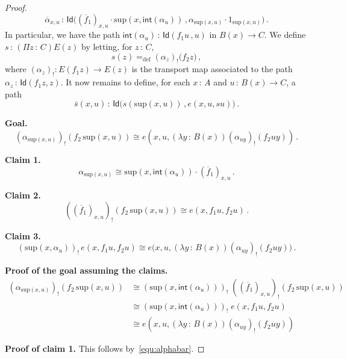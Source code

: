 \documentclass[10pt,a4paper,oneside,reqno]{amsart}
\numberwithin{equation}{section}
\theoremstyle{mythm}
\theoremstyle{mydef}
\theoremstyle{myrmk}
\newcommand{\defeq}{=_{\mathrm{def}}}
\newcommand{\co}{\,{:}\,}
\newcommand{\ct}{\cdot}
\renewcommand{\int}{\mathsf{int}}
\newcommand{\Id}{\mathsf{Id}}
\renewcommand{\sup}{\mathrm{sup}}
\begin{document}
\begin{proof}
\begin{equation}
\label{equ:alphabar}
\overline{\alpha}_{x,u} \co \Id \big(  (\overline{f}_1)_{x,u} \ct \sup(x,\int(\alpha_u)) \, , \alpha_{\sup(x,u)} \cdot 1_{\sup(x,u)} \big)  \, . 
\end{equation}
In particular, we have the path $\int(\alpha_u )\co \Id( f_1  u \, ,  u)$ in $B(x) \to C$. 
We define $s \co (\Pi z \co C) E(z)$ by letting, for $z \co C$, 
\begin{equation*}
s(z) \defeq (\alpha_z)_{!} \big(  f_2 z \big) \, ,
\end{equation*}
where  $(\alpha_z)_{!} : E(f_1 z) \to E(z)$ is the transport map associated to the path
$\alpha_z \co \Id( f_1 z,  z)$. It now remains to  define, for each $x \co A$ and $u \co B(x)\to C$, 
a path
\[
\bar{s}(x,u) \co \Id\big( s(\sup(x,u)) \, , e(x, u, s  u) \big) \, .
\] 

\noindent
\textbf{Goal.} 
\begin{equation}\label{eq:proof:thm:WMain:needpath}
(\alpha_{\sup(x,u)})_{!} (  f_2 \, \sup(x,u) )  \cong
e(x, u, (\lambda y \co B(x)) (\alpha_{u y})_{!} ( f_2 u y)   )  \, .
\end{equation}

\bigskip

\noindent
\textbf{Claim 1.} 
\[
\alpha_{\sup(x,u)} \cong \sup(x, \int(\alpha_u)) \ct (\overline{f}_1)_{x,u} \, .
\]

\medskip

\noindent
\textbf{Claim 2.} 
\[
((\overline{f}_1)_{x,u})_{!} (f_2 \, \sup(x,u)) \cong e(x,  f_1 u, f_2 u) \, .
\]

\noindent
\textbf{Claim 3.}
\[
(\sup(x, \alpha_u))_{!} \, e(x, f_1 u, f_2 u) \cong 
 e\big(x, u, (\lambda y \co B(x)) (\alpha_{uy})_{!}(f_2 u y) \big) \, .
 \]
 
 
 \medskip
 
 \noindent
 \textbf{Proof of the goal assuming the claims.} 
 \begin{align*}   (\alpha_{\sup(x,u)})_{!} ( f_2 \, \sup(x,u) )   
 &  \cong   (\sup(x, \int(\alpha_u)))_{!} \;  ((\overline{f}_1)_{x,u})_{!}  (f_2 \, \sup(x,u) ) \\
 & \cong   (\sup(x, \int(\alpha_u)))_{!} \;   e(x, f_1 u, f_2 u)  \\
 & \cong   e(x, u, (\lambda y \co B(x)) (\alpha_{uy})_{!}( f_2 u y))
  \end{align*} 
 
  
 \noindent
 \textbf{Proof of claim 1.} This follows by~\eqref{equ:alphabar}.
 
 \bigskip
 

\end{proof}
\end{document}

